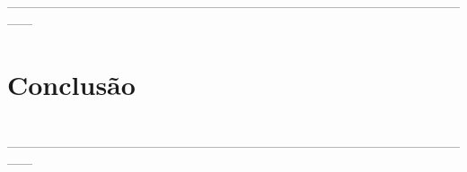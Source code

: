 \documentclass[12pt,twoside]{article}
\begin{document}
        \lipsum[2] \\
        ------------------------------------------------------------------------------------------------------------------
        
        \newpage
        
    \section{Conclusão}
        \lipsum[1] \\
        ------------------------------------------------------------------------------------------------------------------
        
        \newpage

    
    
    \thispagestyle{empty}
\end{document}
